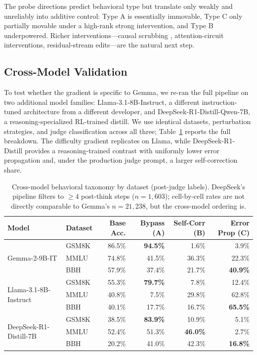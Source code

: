\documentclass[10pt]{article} %
\begin{document}
The probe directions predict behavioral type but translate only weakly and unreliably into additive control: Type A is essentially immovable, Type C only partially movable under a high-rank strong intervention, and Type B underpowered. Richer interventions---causal scrubbing \citep{chan2022}, attention-circuit interventions, residual-stream edits---are the natural next step.


\subsection{Cross-Model Validation}
\label{sec:crossmodel}

To test whether the gradient is specific to Gemma, we re-ran the full pipeline on two additional model families: Llama-3.1-8B-Instruct, a different instruction-tuned architecture from a different developer, and DeepSeek-R1-Distill-Qwen-7B, a reasoning-specialized RL-trained distill. We use identical datasets, perturbation strategies, and judge classification across all three; Table~\ref{tab:crossmodel} reports the full breakdown. The difficulty gradient replicates on Llama, while DeepSeek-R1-Distill provides a reasoning-trained contrast with uniformly lower error propagation and, under the production judge prompt, a larger self-correction share.

\begin{table}[t]
\caption{Cross-model behavioral taxonomy by dataset (post-judge labels). DeepSeek's pipeline filters to $\geq 4$ post-think steps ($n = 1{,}603$); cell-by-cell rates are not directly comparable to Gemma's $n = 21{,}238$, but the cross-model ordering is.}
\label{tab:crossmodel}
\begin{center}
\scriptsize
\begin{tabular}{llrrrr}
\toprule
\textbf{Model} & \textbf{Dataset} & \textbf{Base Acc.} & \textbf{Bypass (A)} & \textbf{Self-Corr (B)} & \textbf{Error Prop (C)} \\
\midrule
\multirow{3}{*}{Gemma-2-9B-IT} & GSM8K & 86.5\% & \textbf{94.5\%} & 1.6\% & 3.9\% \\
 & MMLU & 74.8\% & 41.5\% & 36.3\% & 22.3\% \\
 & BBH & 57.9\% & 37.4\% & 21.7\% & \textbf{40.9\%} \\
\midrule
\multirow{3}{*}{Llama-3.1-8B-Instruct} & GSM8K & 55.3\% & \textbf{79.7\%} & 7.8\% & 12.4\% \\
 & MMLU & 40.8\% & 7.5\% & 29.8\% & 62.8\% \\
 & BBH & 40.1\% & 17.7\% & 16.7\% & \textbf{65.5\%} \\
\midrule
\multirow{3}{*}{DeepSeek-R1-Distill-7B} & GSM8K & 38.5\% & \textbf{83.9\%} & 10.9\% & 5.1\% \\
 & MMLU & 52.4\% & 51.3\% & \textbf{46.0\%} & 2.7\% \\
 & BBH & 20.2\% & 41.0\% & 42.3\% & \textbf{16.8\%} \\
\bottomrule
\end{tabular}
\end{center}
\end{table}
\end{document}
